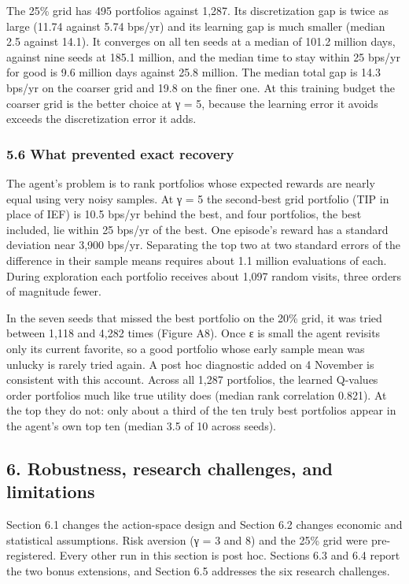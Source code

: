 \documentclass[
  11pt]{article}
\begin{document}
The 25\% grid has 495 portfolios against 1,287. Its discretization gap
is twice as large (11.74 against 5.74 bps/yr) and its learning gap is
much smaller (median 2.5 against 14.1). It converges on all ten seeds at
a median of 101.2 million days, against nine seeds at 185.1 million, and
the median time to stay within 25 bps/yr for good is 9.6 million days
against 25.8 million. The median total gap is 14.3 bps/yr on the coarser
grid and 19.8 on the finer one. At this training budget the coarser grid
is the better choice at γ = 5, because the learning error it avoids
exceeds the discretization error it adds.

\subsubsection{5.6 What prevented exact
recovery}\label{what-prevented-exact-recovery}

The agent's problem is to rank portfolios whose expected rewards are
nearly equal using very noisy samples. At γ = 5 the second-best grid
portfolio (TIP in place of IEF) is 10.5 bps/yr behind the best, and four
portfolios, the best included, lie within 25 bps/yr of the best. One
episode's reward has a standard deviation near 3,900 bps/yr. Separating
the top two at two standard errors of the difference in their sample
means requires about 1.1 million evaluations of each. During exploration
each portfolio receives about 1,097 random visits, three orders of
magnitude fewer.

In the seven seeds that missed the best portfolio on the 20\% grid, it
was tried between 1,118 and 4,282 times (Figure A8). Once ε is small the
agent revisits only its current favorite, so a good portfolio whose
early sample mean was unlucky is rarely tried again. A post hoc
diagnostic added on 4 November is consistent with this account. Across
all 1,287 portfolios, the learned Q-values order portfolios much like
true utility does (median rank correlation 0.821). At the top they do
not: only about a third of the ten truly best portfolios appear in the
agent's own top ten (median 3.5 of 10 across seeds).

\subsection{6. Robustness, research challenges, and
limitations}\label{robustness-research-challenges-and-limitations}

Section 6.1 changes the action-space design and Section 6.2 changes
economic and statistical assumptions. Risk aversion (γ = 3 and 8) and
the 25\% grid were pre-registered. Every other run in this section is
post hoc. Sections 6.3 and 6.4 report the two bonus extensions, and
Section 6.5 addresses the six research challenges.
\end{document}
